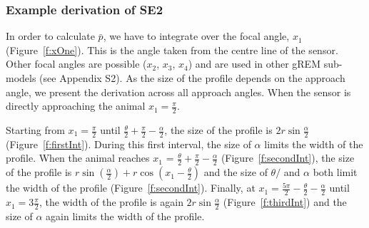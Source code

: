 \documentclass[a4paper,10pt,reqno,oneside]{amsart}
\begin{document}
\subsubsection{Example derivation of SE2}

In order to calculate $\bar{p}$, we have to integrate over the focal angle, $x_1$ (Figure~\ref{f:xOne}). This is the angle taken from the centre line of the sensor. Other focal angles are possible ($x_2$, $x_3$, $x_4$) and are used in other gREM sub-models (see Appendix S2). As the size of the profile depends on the approach angle, we present the derivation across all approach angles. When the sensor is directly approaching the animal $x_1  = \frac{\pi}{2}$.

Starting from $x_1 = \frac{\pi}{2}$ until $\frac{\theta}{2} + \frac{\pi}{2} - \frac{\alpha}{2}$, the size of the profile is $2r\sin \frac{\alpha}{2}$ (Figure~\ref{f:firstInt}). During this first interval, the size of $\alpha$ limits the width of the profile. When the animal reaches $x_1$  = $\frac{\theta}{2} + \frac{\pi}{2} - \frac{\alpha}{2}$ (Figure~\ref{f:secondInt}), the size of the profile is $r\sin( \frac{\alpha}{2}) + r\cos( x_1  - \frac{\theta}{2})$ and the size of $\theta/$ and $\alpha$ both limit the width of the profile (Figure~\ref{f:secondInt}). Finally, at $x_1  = \frac{5\pi}{2} - \frac{\theta}{2}  - \frac{\alpha}{2}$ until $x_1  = 3\frac{\pi}{2}$, the width of the profile is again $2r\sin\frac{\alpha}{2}$ (Figure~\ref{f:thirdInt}) and the size of $\alpha$ again limits the width of the profile. 
\end{document}
